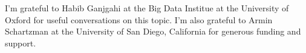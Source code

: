 I'm grateful to Habib Ganjgahi at the Big Data Institue at the University of Oxford for useful conversations on this topic. I'm also grateful to Armin Schartzman at the University of San Diego, California for generous funding and support. 